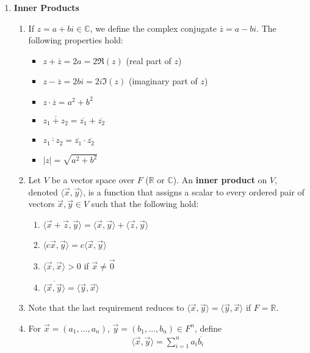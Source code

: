 \documentclass[10pt]{article}
\begin{document}
\begin{multicols*}{2}
\begin{enumerate}
    \item \textbf{Inner Products}
    \begin{enumerate}
        \item If $z=a+bi \in \mathbb{C}$, we define the complex conjugate $\overline{z}=a-bi$. The following properties hold:
        \begin{itemize}
            \item $z + \overline{z} = 2a = 2\Re(z)$ (real part of $z$)
            \item $z - \overline{z} = 2bi = 2i\Im(z)$ (imaginary part of $z$)
            \item $z \cdot \overline{z} = a^2+b^2$
            \item $\overline{z_1 + z_2} = \overline{z_1} + \overline{z_2}$
            \item $\overline{z_1 \cdot z_2} = \overline{z_1} \cdot \overline{z_2}$
            \item $|z| = \sqrt{a^2 + b^2}$
        \end{itemize}
        \item Let $V$ be a vector space over $F$ ($\mathbb{R}$ or $\mathbb{C}$). An \textbf{inner product} on $V$, denoted $\langle \vec{x}, \vec{y} \rangle$, is a function that assigns a scalar to every ordered pair of vectors $\vec{x}, \vec{y} \in V$ such that the following hold:
        \begin{enumerate}
            \item $\langle \vec{x} + \vec{z}, \vec{y} \rangle = \langle \vec{x}, \vec{y} \rangle + \langle \vec{z}, \vec{y} \rangle$
            \item $\langle c\vec{x}, \vec{y} \rangle = c\langle \vec{x}, \vec{y} \rangle$
            \item $\langle \vec{x}, \vec{x} \rangle > 0$ if $\vec{x} \neq \vec{0}$
            \item $\overline{\langle \vec{x}, \vec{y} \rangle} = \langle \vec{y}, \vec{x} \rangle$
        \end{enumerate}
        \item Note that the last requirement reduces to $\langle \vec{x}, \vec{y} \rangle = \langle \vec{y}, \vec{x} \rangle$ if $F=\mathbb{R}$. 
        \item For $\vec{x} = (a_1, \hdots, a_n)$, $\vec{y} = (b_1, \hdots, b_n) \in F^n$, define 
        \begin{align*}
            \langle \vec{x}, \vec{y} \rangle = \sum_{i=1}^n a_i\overline{b_i}
        \end{align*}

\end{enumerate}
\end{enumerate}
\end{multicols*}
\end{document}
